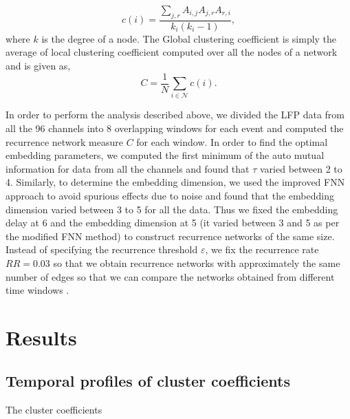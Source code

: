 \documentclass[letterpaper, 9pt, conference]{ieeeconf}
\begin{document}
\begin{equation}
c(i)=\frac{\sum_{j,r}A_{i,j}A_{j,r}A_{r,i}}{k_{i}(k_{i}-1)},
\end{equation}
where $k$ is the degree of a node. The Global clustering coefficient is simply the average of local clustering coefficient computed over all the nodes of a network and is given as,
\begin{equation}
C= \frac{1}{N}\sum_{i\in\mathcal{N}}c(i).
\end{equation}


In order to perform the analysis described above, we divided the LFP data from all the 96 channels into 8 overlapping windows for each event and computed the recurrence network measure $C$ for each window. In order to find the optimal embedding parameters, we computed the first minimum of the auto mutual information for data from all the channels and found that $\tau$ varied between 2 to 4. Similarly, to determine the embedding dimension, we used the improved FNN approach \cite{hegger1999improved} to avoid spurious effects due to noise and found that the embedding dimension varied between 3 to 5 for all the data. Thus we fixed the embedding delay at 6 and the embedding dimension at 5 (it varied between 3 and 5 as per the modified FNN method) to construct recurrence networks of the same size. Instead of specifying the recurrence threshold $\varepsilon$, we fix the recurrence rate $RR = 0.03$ so that we obtain recurrence networks with approximately the same number of edges so that we can compare the networks obtained from different time windows \cite{donner2011recurrence}. 

\section{Results}
\label{sec:results}

\subsection{Temporal profiles of cluster coefficients}
The cluster coefficients 
\end{document}
